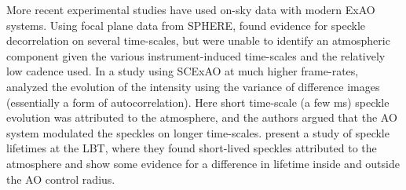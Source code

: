 \documentclass[10pt,preprint]{aastex631}
\begin{document}

More recent experimental studies have used on-sky data with modern ExAO systems.  Using focal plane data from SPHERE, \citet{2016SPIE.9909E..4ZM} found evidence for speckle decorrelation on several time-scales, but were unable to identify an atmospheric component given the various instrument-induced time-scales and the relatively low cadence used. In a study using SCExAO at much higher frame-rates, \citet{2018PASP..130j4502G} analyzed the evolution of the intensity using the variance of difference images (essentially a form of autocorrelation).  Here short time-scale (a few ms) speckle evolution was attributed to the atmosphere, and the authors argued that the AO system modulated the speckles on longer time-scales.  \citet{2017JATIS...3b5001S} present a study of speckle lifetimes at the LBT, where they found short-lived speckles attributed to the atmosphere and show some evidence for a difference in lifetime inside and outside the AO control radius.
\end{document}
